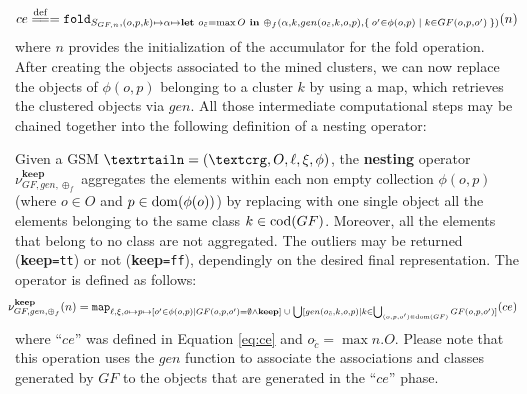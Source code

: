 \begin{equation}\label{eq:ce}
ce\overset{\mathrm{def}}{=\mathrel{\mkern-3mu}=}=\texttt{fold}_{S_{GF,n},(o,p,k)\mapsto \alpha\mapsto\textbf{let }o_{\tilde{c}}=\max O\textbf{ in } \oplus_f(\alpha,k,gen(o_{\tilde{c}},k,o,p),\Set{o'\in\phi(o,p)|k\in GF(o,p,o')})}(n)
\end{equation}
where $n$ provides the initialization of the accumulator for the fold operation.
After creating the objects associated to the mined clusters, we can now replace the objects of $\phi(o,p)$ belonging to a cluster $k$ by using a map, which retrieves the clustered objects via $gen$. All those intermediate computational steps may be chained together into the following definition of a nesting operator:

\begin{definition}[Nesting]\label{def:semistructnest}
	Given a GSM $\fullnested$, the \textbf{nesting} operator $\nu_{GF,gen,\oplus_f}^{\textbf{keep}}$ aggregates the elements within each non empty collection $\phi(o,p)$ (where $o\in O$ and $p\in\operatorname{dom}(\phi(o))$) by replacing with one single object all the elements belonging to the same class $k\in \operatorname{cod}(GF)$. Moreover, all the elements that belong to no class are not aggregated. The outliers may be returned (\textbf{keep}\texttt{=tt}) or not (\textbf{keep}\texttt{=ff}), dependingly on the desired final representation. The operator is defined as follows:
	\[\hspace{-.25cm}\nu^{\textbf{keep}}_{GF,gen,\oplus_f}(n)=\texttt{map}_{\ell,\xi,o\mapsto p\mapsto [o'\in \phi(o,p)|GF(o,p,o')=\emptyset\wedge \textbf{keep}]\;\cup\;\bigcup[gen(o_{\tilde{c}},k,o,p)|k\in\bigcup_{(o,p,o')\in\dom(GF)} GF(o,p,o')]}(ce)\]
where ``$ce$'' was defined in Equation \vref{eq:ce} and $o_{\tilde{c}} = \max n.O$. Please note that this operation uses the $gen$ function to associate the associations and classes generated by $GF$ to the objects that are generated in the ``$ce$'' phase.
\end{definition}

